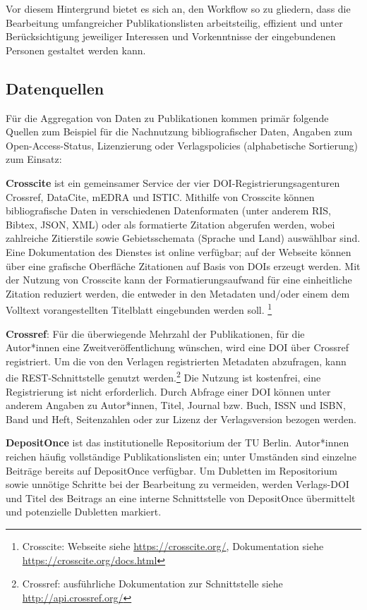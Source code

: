 \documentclass[a4paper,
fontsize=11pt,
oneside,
numbers=noperiodatend,
parskip=half-,
bibliography=totoc,
final
]{scrartcl}
\begin{document}
Vor diesem Hintergrund bietet es sich an, den Workflow so zu gliedern,
dass die Bearbeitung umfangreicher Publikationslisten arbeitsteilig,
effizient und unter Berücksichtigung jeweiliger Interessen und
Vorkenntnisse der eingebundenen Personen gestaltet werden kann.

\hypertarget{datenquellen}{%
\subsection{Datenquellen}\label{datenquellen}}

Für die Aggregation von Daten zu Publikationen kommen primär folgende
Quellen zum Beispiel für die Nachnutzung bibliografischer Daten, Angaben
zum Open-Access-Status, Lizenzierung oder Verlagspolicies (alphabetische
Sortierung) zum Einsatz:

\textbf{Crosscite} ist ein gemeinsamer Service der vier
DOI-Registrierungsagenturen Crossref, DataCite, mEDRA und ISTIC.
Mithilfe von Crosscite können bibliografische Daten in verschiedenen
Datenformaten (unter anderem RIS, Bibtex, JSON, XML) oder als
formatierte Zitation abgerufen werden, wobei zahlreiche Zitierstile
sowie Gebietsschemata (Sprache und Land) auswählbar sind. Eine
Dokumentation des Dienstes ist online verfügbar; auf der Webseite können
über eine grafische Oberfläche Zitationen auf Basis von DOIs erzeugt
werden. Mit der Nutzung von Crosscite kann der Formatierungsaufwand für
eine einheitliche Zitation reduziert werden, die entweder in den
Metadaten und/oder einem dem Volltext vorangestellten Titelblatt
eingebunden werden soll. \footnote{Crosscite: Webseite siehe
  \url{https://crosscite.org/}, Dokumentation siehe
  \url{https://crosscite.org/docs.html}}

\textbf{Crossref}: Für die überwiegende Mehrzahl der Publikationen, für
die Autor*innen eine Zweitveröffentlichung wünschen, wird eine DOI über
Crossref registriert. Um die von den Verlagen registrierten Metadaten
abzufragen, kann die REST-Schnittstelle genutzt werden.\footnote{Crossref:
  ausführliche Dokumentation zur Schnittstelle siehe
  \url{http://api.crossref.org/}} Die Nutzung ist kostenfrei, eine
Registrierung ist nicht erforderlich. Durch Abfrage einer DOI können
unter anderem Angaben zu Autor*innen, Titel, Journal bzw. Buch, ISSN und
ISBN, Band und Heft, Seitenzahlen oder zur Lizenz der Verlagsversion
bezogen werden.

\textbf{DepositOnce} ist das institutionelle Repositorium der TU Berlin.
Autor*innen reichen häufig vollständige Publikationslisten ein; unter
Umständen sind einzelne Beiträge bereits auf DepositOnce verfügbar. Um
Dubletten im Repositorium sowie unnötige Schritte bei der Bearbeitung zu
vermeiden, werden Verlags-DOI und Titel des Beitrags an eine interne
Schnittstelle von DepositOnce übermittelt und potenzielle Dubletten
markiert.
\end{document}
